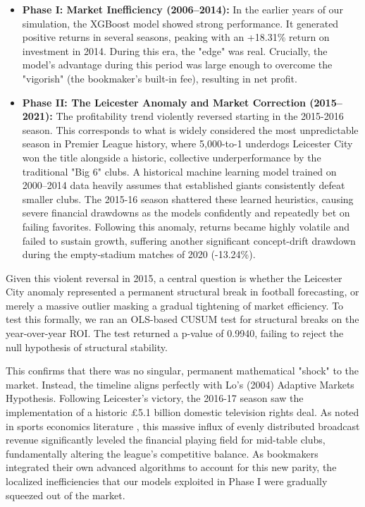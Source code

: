 \documentclass[pdflatex,sn-basic]{sn-jnl}
\begin{document}
\begin{itemize}
    \item \textbf{Phase I: Market Inefficiency (2006–2014):} In the earlier years of our simulation, the XGBoost model showed strong performance. It generated positive returns in several seasons, peaking with an +18.31\% return on investment in 2014. During this era, the "edge" was real. Crucially, the model's advantage during this period was large enough to overcome the "vigorish" (the bookmaker's built-in fee), resulting in net profit.
    \item \textbf{Phase II: The Leicester Anomaly and Market Correction (2015–2021):} The profitability trend violently reversed starting in the 2015-2016 season. This corresponds to what is widely considered the most unpredictable season in Premier League history, where 5,000-to-1 underdogs Leicester City won the title alongside a historic, collective underperformance by the traditional "Big 6" clubs. A historical machine learning model trained on 2000–2014 data heavily assumes that established giants consistently defeat smaller clubs. The 2015-16 season shattered these learned heuristics, causing severe financial drawdowns as the models confidently and repeatedly bet on failing favorites. Following this anomaly, returns became highly volatile and failed to sustain growth, suffering another significant concept-drift drawdown during the empty-stadium matches of 2020 (-13.24\%).
\end{itemize}

Given this violent reversal in 2015, a central question is whether the Leicester City anomaly represented a permanent structural break in football forecasting, or merely a massive outlier masking a gradual tightening of market efficiency. To test this formally, we ran an OLS-based CUSUM test for structural breaks on the year-over-year ROI. The test returned a p-value of 0.9940, failing to reject the null hypothesis of structural stability. 

This confirms that there was no singular, permanent mathematical "shock" to the market. Instead, the timeline aligns perfectly with Lo's (2004) Adaptive Markets Hypothesis. Following Leicester's victory, the 2016-17 season saw the implementation of a historic \pounds 5.1 billion domestic television rights deal. As noted in sports economics literature \cite{peeters2011}, this massive influx of evenly distributed broadcast revenue significantly leveled the financial playing field for mid-table clubs, fundamentally altering the league's competitive balance. As bookmakers integrated their own advanced algorithms to account for this new parity, the localized inefficiencies that our models exploited in Phase I were gradually squeezed out of the market.
\end{document}
